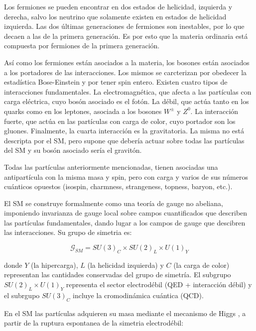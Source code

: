 Los fermiones se pueden encontrar en dos estados de helicidad, izquierda y derecha, salvo los neutrino que solamente existen en estados de helicidad izquierda. Las dos últimas generaciones de fermiones son inestables, por lo que decaen a las de la primera generación. Es por esto que la materia ordinaria está compuesta por fermiones de la primera generación.

Así como los fermiones están asociados a la materia, los bosones están asociados a los portadores de las interacciones. Los mismos se carcterizan por obedecer la estadística Bose-Einstein y por tener spin entero. Existen cuatro tipos de interacciones fundamentales. La electromagnética, que afecta a las partículas con carga eléctrica, cuyo bosón asociado es el fotón. La débil, que actúa tanto en los quarks como en los leptones, asociada a los bosones $W^{\pm}$ y $Z^{0}$. La interacción fuerte, que actúa en las partículas con carga de color, cuyo portador son los gluones. Finalmente, la cuarta interacción es la gravitatoria. La misma no está descripta por el SM, pero supone que debería actuar sobre todas las partículas del SM y su bosón asociado sería el gravitón.

Todas las partículas anteriormente mencionadas, tienen asociadas una antipartícula con la misma masa y spin, pero con carga y varios de sus números cuánticos opuestos (isospin, charmness, strangeness, topness, baryon, etc.). 

El SM se construye formalmente como una teoría de gauge no abeliana, imponiendo invarianza de gauge local sobre campos cuantificados que describen las partículas fundamentales, dando lugar a los campos de gauge que descibren las interacciones. Su grupo de simetria es:

\begin{equation}
\mathcal{G}_{SM}=SU(3)_{C}\times SU(2)_{L}\times U(1)_{Y}
\end{equation}


donde $Y$ (la hipercarga), $L$ (la helicidad izquierda) y $C$ (la carga de color) representan las cantidades conservadas del grupo de simetría. El subgrupo $SU(2)_{L}\times U(1)_{Y}$ representa el sector electrodébil (QED + interacción débil) y el subrgupo $SU(3)_{C}$ incluye la cromodinámica cuántica (QCD).


En el SM las partículas adquieren su masa mediante el mecanismo de Higgs \cite{PhysRevLett.13.508}, a partir de la ruptura espontanea de la simetria electrodébil:

